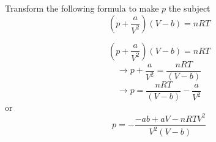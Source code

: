 \question Transform the following formula to make $p$ the subject
\[
	\left( p + \frac{a}{V^{2}} \right) \left( V - b \right)
	=
	nRT
\]
\begin{solution}
	\[
		\left( p + \frac{a}{V^{2}} \right) \left( V - b \right)
		=
		nRT
	\]
	\[
		\rightarrow
		p + \frac{a}{V^{2}}
		=
		\frac{nRT}{\left( V - b \right)}
	\]
	\[
		\rightarrow
		p 
		=
		\frac{nRT}{\left( V - b \right)} - \frac{a}{V^{2}}
	\]
	or
	\[
		p 
		= 
		- \frac{-ab + aV - nRTV^{2}}{V^{2} (V-b)}
	\]
\end{solution}

